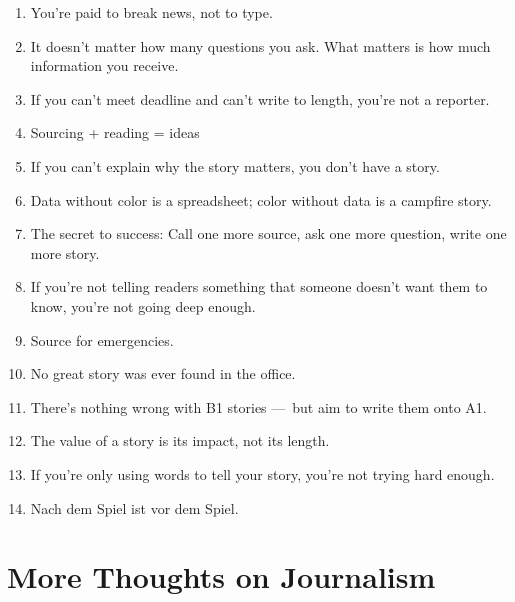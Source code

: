 \documentclass[
  12pt,
  american,
  letterpaperpaper,
  extrafontsizes,onecolumn,openright
  ]{memoir}
\providecommand{\tightlist}{%
  \setlength{\itemsep}{0pt}\setlength{\parskip}{0pt}}
\begin{document}
\begin{enumerate}
\def\labelenumi{\arabic{enumi}.}
\tightlist
\item
  You're paid to break news, not to type.~
\item
  It doesn't matter how many questions you ask. What matters is how much information you receive.
\item
  If you can't meet deadline and can't write to length, you're not a reporter.~
\item
  Sourcing + reading = ideas
\item
  If you can't explain why the story matters, you don't have a story.~
\item
  Data without color is a spreadsheet; color without data is a campfire story.~
\item
  The secret to success: Call one more source, ask one more question, write one more story.~
\item
  If you're not telling readers something that someone doesn't want them to know, you're not going deep enough.
\item
  Source for emergencies.~
\item
  No great story was ever found in the office.~
\item
  There's nothing wrong with B1 stories ---~but aim to write them onto A1.~
\item
  The value of a story is its impact, not its length.~
\item
  If you're only using words to tell your story, you're not trying hard enough.~
\item
  Nach dem Spiel ist vor dem Spiel.
\end{enumerate}

\hypertarget{more-thoughts-on-journalism}{%
\chapter*{More Thoughts on Journalism}\label{more-thoughts-on-journalism}}
\end{document}
